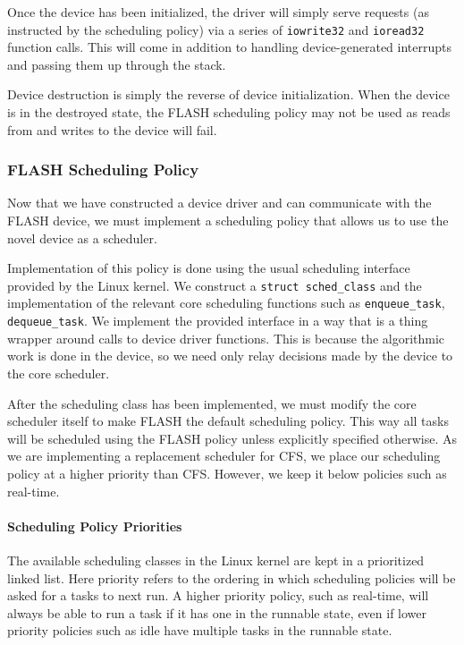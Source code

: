 \documentclass{sig-alternate-10pt}
\begin{document}
Once the device has been initialized, the driver will simply serve requests
(as instructed by the scheduling policy) via a series of \texttt{iowrite32}
and \texttt{ioread32} function calls.  This will come in addition to
handling device-generated interrupts and passing them up through the stack.

Device destruction is simply the reverse of device initialization.  When the
device is in the destroyed state, the FLASH scheduling policy may not be
used as reads from and writes to the device will fail.

\subsubsection{FLASH Scheduling Policy}
Now that we have constructed a device driver and can communicate with the
FLASH device, we must implement a scheduling policy that allows us to use
the novel device as a scheduler.

Implementation of this policy is done using the usual scheduling interface
provided by the Linux kernel.  We construct a \texttt{struct sched\_class}
and the implementation of the relevant core scheduling functions such as
\texttt{enqueue\_task}, \texttt{dequeue\_task}.  We implement the provided
interface in a way that is a thing wrapper around calls to device driver
functions.  This is because the algorithmic work is done in the device, so
we need only relay decisions made by the device to the core scheduler.

After the scheduling class has been implemented, we must modify the core
scheduler itself to make FLASH the default scheduling policy.  This way all
tasks will be scheduled using the FLASH policy unless explicitly specified
otherwise.  As we are implementing a replacement scheduler for CFS, we place
our scheduling policy at a higher priority than CFS.  However, we keep it
below policies such as real-time.

\paragraph{Scheduling Policy Priorities}
The available scheduling classes in the Linux kernel are kept in
a prioritized linked list.  Here priority refers to the ordering in which
scheduling policies will be asked for a tasks to next run.  A higher
priority policy, such as real-time, will always be able to run a task if it
has one in the runnable state, even if lower priority policies such as idle
have multiple tasks in the runnable state.
\end{document}

